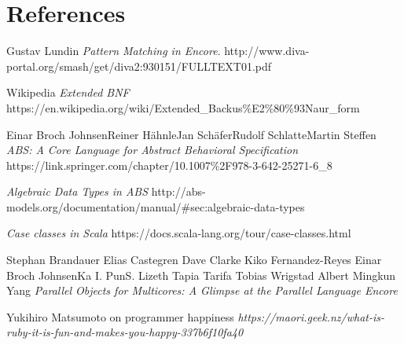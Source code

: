 \documentclass[10pt]{report}
\begin{document}
\chapter{References}


\begin{thebibliography}{9}
Gustav Lundin
\textit{Pattern Matching in Encore}.
http://www.diva-portal.org/smash/get/diva2:930151/FULLTEXT01.pdf

Wikipedia
\textit{Extended BNF}
https://en.wikipedia.org/wiki/Extended\_Backus\%E2\%80\%93Naur\_form

Einar Broch JohnsenReiner HähnleJan SchäferRudolf SchlatteMartin Steffen
\textit{ABS: A Core Language for Abstract Behavioral Specification}
https://link.springer.com/chapter/10.1007\%2F978-3-642-25271-6\_8

\textit{Algebraic Data Types in ABS}
http://abs-models.org/documentation/manual/\#sec:algebraic-data-types

\textit{Case classes in Scala}
https://docs.scala-lang.org/tour/case-classes.html

Stephan Brandauer Elias Castegren Dave Clarke Kiko Fernandez-Reyes Einar Broch JohnsenKa I. PunS. Lizeth Tapia Tarifa Tobias Wrigstad Albert Mingkun Yang
\textit{Parallel Objects for Multicores: A Glimpse at the Parallel Language Encore}


Yukihiro Matsumoto on programmer happiness
\textit{https://maori.geek.nz/what-is-ruby-it-is-fun-and-makes-you-happy-337b6f10fa40}


\end{thebibliography}


\begin{appendices}
\end{appendices}
\end{document}
